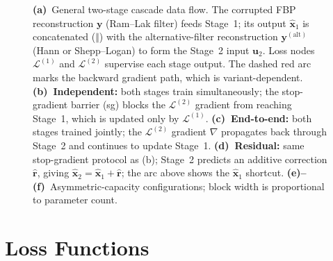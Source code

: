 \begin{figure}[!htb]
\caption[Cascade architecture variants.]{%
    \textbf{(a)}~General two-stage cascade data flow. The corrupted FBP
    reconstruction $\mathbf{y}$ (Ram--Lak filter) feeds Stage~1; its output
    $\hat{\mathbf{x}}_1$ is concatenated ($\Vert$) with the
    alternative-filter reconstruction $\mathbf{y}^{(\mathrm{alt})}$
    (Hann or Shepp--Logan) to form the Stage~2 input $\mathbf{u}_2$.
    Loss nodes $\mathcal{L}^{(1)}$ and $\mathcal{L}^{(2)}$ supervise
    each stage output. The dashed red arc marks the backward gradient path,
    which is variant-dependent.
    \textbf{(b)~Independent:} both stages train simultaneously; the
    stop-gradient barrier (sg) blocks the $\mathcal{L}^{(2)}$ gradient from
    reaching Stage~1, which is updated only by $\mathcal{L}^{(1)}$.
    \textbf{(c)~End-to-end:} both stages trained jointly; the
    $\mathcal{L}^{(2)}$ gradient $\nabla$ propagates back through Stage~2
    and continues to update Stage~1.
    \textbf{(d)~Residual:} same stop-gradient protocol as (b); Stage~2
    predicts an additive correction $\hat{\mathbf{r}}$, giving
    $\hat{\mathbf{x}}_2 = \hat{\mathbf{x}}_1 + \hat{\mathbf{r}}$;
    the arc above shows the $\hat{\mathbf{x}}_1$ shortcut.
    \textbf{(e)--(f)}~Asymmetric-capacity configurations; block width is
    proportional to parameter count.}
\label{fig:meth_cascade_variants}
\end{figure}

\FloatBarrier

\section{Loss Functions}
\label{sec:meth_loss}

